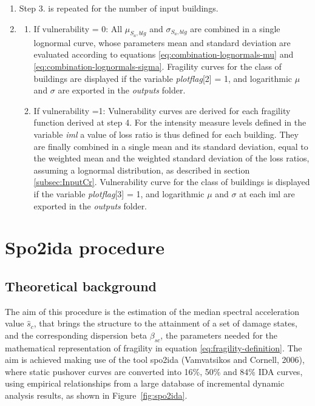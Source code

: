 \begin{enumerate}
\item Step 3. is repeated for the number of input buildings.

\item
\begin{enumerate}
\item If vulnerability = 0: All $\mu_{S_a, blg}$ and $\sigma_{S_a, blg}$ are combined in a single lognormal curve, whose parameters mean and standard deviation are evaluated according to equations \ref{eq:combination-lognormals-mu} and \ref{eq:combination-lognormals-sigma}. Fragility curves for the class of buildings are displayed if the variable \textit{plotflag}[2] = 1, and logarithmic $\mu$ and $\sigma$ are exported in the \textit{outputs} folder.
\item If vulnerability =1: Vulnerability curves are derived for each fragility function derived at step 4. For the intensity measure levels defined in the variable \textit{iml} a value of loss ratio is thus defined for each building. They are finally combined in a single mean and its standard deviation, equal to the weighted mean and the weighted standard deviation of the loss ratios, assuming a lognormal distribution, as described in section \ref{subsec:InputCr}. Vulnerability curve for the class of buildings is displayed if the variable \textit{plotflag}[3] = 1, and logarithmic $\mu$ and $\sigma$ at each iml are exported in the \textit{outputs} folder.
\end{enumerate}
\end{enumerate}

\section{Spo2ida procedure}
\label{sec:spo2ida}
\subsection{Theoretical background}
The aim of this procedure is the estimation of the median spectral acceleration value $\hat{s}_c$, that brings the structure to the attainment of a set of damage states, and the corresponding dispersion beta $\beta_{sc}$, the parameters needed for the mathematical representation of fragility in equation \ref{eq:fragility-definition}. The aim is achieved making use of the tool spo2ida (Vamvatsikos and Cornell, 2006), where static pushover curves are converted into 16\%, 50\% and 84\% IDA curves, using empirical relationships from a large database of incremental dynamic analysis results, as shown in Figure~\ref{fig:spo2ida}.

